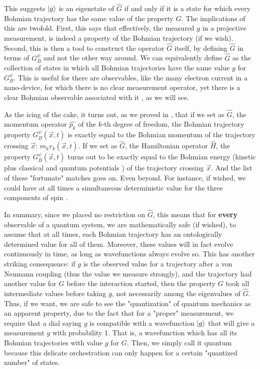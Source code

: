 \documentclass[11pt, a4paper]{article} %
\begin{document}
This suggests $\ket{g}$ is an eigenstate of $\hat{G}$ if and only if it is a state for which every Bohmian trajectory has the same value of the property $G$. The implications of this are twofold. First, this says that effectively, the measured $g$ in a projective measurement, is indeed a property of the Bohmian trajectory (if we wish). Second, this is then a tool to construct the operator $\hat{G}$ itself, by defining $\hat{G}$ in terms of $G^\psi_B$ and not the other way around. We can equivalently define $\hat{G}$ as the collection of states in which all Bohmian trajectories have the same value $g$ for $G_B^\psi$. This is useful for there are observables, like the many electron current in a nano-device, for which there is no clear measurement operator, yet there is a clear Bohmian observable associated with it \cite{Pel, equiv}, as we will see.

As the icing of the cake, it turns out, as we proved in \cite{DevInPosition1}, that if we set as $\hat{G}$, the momentum operator $\hat{p_k}$ of the $k$-th degree of freedom, the Bohmian trajectory property $G^\psi_B(\vec{x},t)$ is exactly equal to the Bohmian momentum of the trajectory crossing $\vec{x}$: $m_k v_k(\vec{x},t)$. If we set as $\hat{G}$, the Hamiltonian operator $\hat{H}$, the property $G^\psi_B(\vec{x},t)$ turns out to be exactly equal to the Bohmian energy (kinetic plus classical and quantum potentials \cite{JordiXavier}) of the trajectory crossing $\vec{x}$. And the list of these "fortunate" matches goes on. Even beyond. For instance, if wished, we could have at all times a simultaneous deterministic value for the three components of spin \cite{spin}.

In summary, since we placed no restriction on $\hat{G}$, this means that for {\bf every} observable of a quantum system, we are mathematically safe (if wished), to assume that at all times, each Bohmian trajectory has an ontologically determined value for all of them. Moreover, these values will in fact evolve continuously in time, as long as wavefunctions always evolve so. This has another striking consequence: if $g$ is the observed value for a trajectory after a von Neumann coupling (thus the value we measure strongly), and the trajectory had another value for $G$ before the interaction started, then the property $G$ took all intermediate values before taking $g$, not necessarily among the eigenvalues of $\hat{G}$. Thus, if we want, we are safe to see the "quantization" of quantum mechanics as an apparent property, due to the fact that for a "proper" measurement, we require that a dial saying $g$ is compatible with a wavefunction $\ket{g}$ that will give a measurement $g$ with probability 1. That is, a wavefunction which has all its Bohmian trajectories with value $g$ for $G$. Then, we simply call it quantum because this delicate orchestration can only happen for a certain "quantized number" of states.
\end{document}
